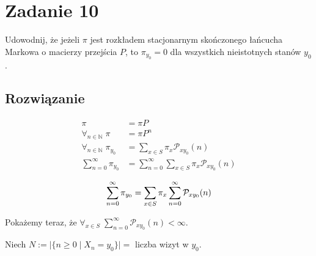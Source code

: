 \section{Zadanie 10}
Udowodnij, że jeżeli \(\pi\) jest rozkładem stacjonarnym skończonego łańcucha Markowa o macierzy przejścia \(P\), to \(\pi_{y_0} = 0\) dla wszystkich nieistotnych stanów \(y_0\).

\subsection*{Rozwiązanie}
\[
	\begin{aligned}
		\pi                                     & = \pi P                                                          \\
		\forall_{n \in \mathbb{N}} \; \pi       & = \pi P^n                                                        \\
		\forall_{n \in \mathbb{N}} \; \pi_{y_0} & = \sum_{x \in S} \pi_x \mathcal{P}_{xy_0}(n)                     \\
		\sum_{n = 0}^\infty \pi_{y_0}           & = \sum_{n = 0}^\infty \sum_{x \in S} \pi_x \mathcal{P}_{xy_0}(n) \\
	\end{aligned}
\]
\begin{equation} \label{eq:1}
	\sum_{n = 0}^\infty \pi_{y_0} = \sum_{x \in S} \pi_x \sum_{n = 0}^\infty \mathcal{P}_{xy_0}(n) \\
\end{equation}

Pokażemy teraz, że \(\forall_{x \in S} \; \sum_{n = 0}^\infty \mathcal{P}_{xy_0}(n) < \infty\).

Niech \(N := |\{n \ge 0 \; | \; X_n = y_0\}| = \) liczba wizyt w \(y_0\).

